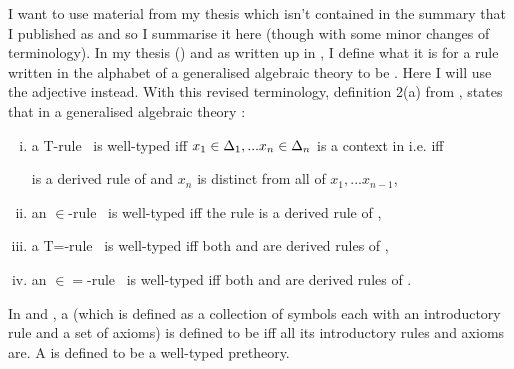 \newcommand{\inlinedisplay}[1]
{
\setlength{\fboxsep}{1.5pt}
\setlength{\fboxrule}{0pt}
\fbox{$\displaystyle #1$}
}

\newcommand{\gatdisplayrule}[2]
{
\setlength{\fboxsep}{1pt}
\setlength{\fboxrule}{0pt}
\fbox{$\displaystyle \frac{#1}{#2}$}
}
\newcommand{\Isort}{I_{sort}}
\newcommand{\Iop}{I_{op}}
\newcommand {\Ihat}{\hat{I}}

\renewcommand{\crossx}[3]{#1 \underset{\tiny #3}{\cross} #2}
\newcommand{\fonestar}   {{f_1}\kern-.15em^*}
\newcommand{\ftwostar}   {{f_2}\kern-.15em^*}
\newcommand{\fjstar}     {{f_j}\kern-.2em^*}
\newcommand{\fjpstar}    {{f_{j-1}}\kern-.25em^*}
\newcommand{\smstar}{{s_m}\kern-.25em^*}
\newcommand{\sonestar}{{s_1}\kern-.15em^*}

\newcommand{\Trule} {T-rule\ }
\newcommand{\trule} {$\in$-rule\ }
\newcommand{\Teqrule} {T=-rule\ }
\newcommand{\teqrule} {$\in=$-rule\ }

\newcommand{\genericAintroductoryrule} {\gatdisplayrule{\xDelta{n}}{\isT{A(\xn}}}
\newcommand{\genericfintroductoryrule}  {\gatdisplayrule{\xDelta{n}}{\ofT{f(\xn)}{\Delta}}}


\note I want to use material from my thesis  \cite{Cartmell78} which isn't contained in
the summary that I  published as \cite{Cartmell86} and so I summarise it here (though with some minor changes of
terminology).
\note 
In my thesis (\cite{Cartmell78}) and as written up in \cite{Cartmell86}, I define what it is for a rule written in the alphabet of a generalised algebraic theory to be . Here I will use the adjective  instead.
With this revised terminology, definition 2(a) from \cite{Cartmell86}, states that in  a generalised algebraic theory \gatUw:
\begin{enumerate} [(i)]
\item 
a \Trule \gatdisplayrule{\xDelta{n}}{\isT{\Delta}} is well-typed  iff 
$x_1 \in \Delta_1,... x_{n} \in \Delta_{n}$ is a context in \gatUw i.e. iff 
\gatdisplayrule{\xDelta{n-1}}{\isT{\Delta_n}} is a derived rule of \gatUw and $x_n$ is distinct from all of $x_1,...x_{n-1}$, 
\item 
an \trule \gatdisplayrule{\xDelta{n}}{\ofT{t}{\Delta}} is well-typed iff
the rule \gatdisplayrule{\xDelta{n}}{\isT{\Delta}} is a derived rule of \gatU,
\item 
a \Teqrule \gatdisplayrule{\xDelta{n}}{\Delta=\Delta'} is well-typed iff
both \gatdisplayrule{\xDelta{n}}{\isT{\Delta}} and \gatdisplayrule{\xDelta{n}}{\isT{\Delta'}} are derived rules
of \gatU,
\item 
an \teqrule \gatdisplayrule{\xDelta{n}}{t=t' \in \Delta} is well-typed iff
both \gatdisplayrule{\xDelta{n}}{\ofT{t}{\Delta}} and \gatdisplayrule{\xDelta{n}}{\ofT{t'}{\Delta}} are derived rules
of \gatU.
\end{enumerate}
In \cite{Cartmell78} and \cite{Cartmell86}, a  (which is defined as a collection of symbols each with an introductory rule and a set of axioms) is defined to be  iff all its introductory rules and axioms are. A  is defined to be a well-typed pretheory.


